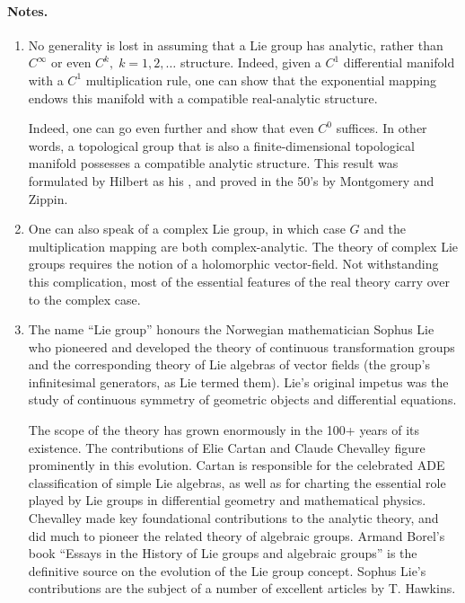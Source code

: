 \documentclass[12pt]{article}
\begin{document}
\paragraph{Notes.}
\begin{enumerate}
\item 
No generality is lost in assuming that a Lie group has analytic,
rather than $C^\infty$ or even $C^k,\; k=1,2,\ldots$ structure.
Indeed, given a $C^1$ differential manifold with a $C^1$
multiplication rule, one can show that the exponential mapping endows
this manifold with a compatible real-analytic structure.  

Indeed, one can go even further and show that even $C^0$ suffices.  In
other words, a topological group that is also a finite-dimensional
topological manifold possesses a compatible analytic structure.  This
result was formulated by Hilbert as his , and
proved in the 50's by Montgomery and Zippin.


\item One can also speak of a complex Lie group, in which case $G$ and the
multiplication mapping are both complex-analytic.  The theory of
complex Lie groups requires the notion of a holomorphic vector-field.
Not withstanding this complication, most of the essential features of
the real theory carry over to the complex case.

\item The name ``Lie group'' honours the Norwegian mathematician
  Sophus Lie who pioneered and developed the theory of continuous
  transformation groups and the corresponding theory of Lie algebras
  of vector fields (the group's infinitesimal generators, as Lie
  termed them).  Lie's original impetus was the study of continuous
  symmetry of geometric objects and differential equations.  
  
  The scope of the theory has grown enormously in the 100+ years of
  its existence.  The contributions of Elie Cartan and Claude
  Chevalley figure prominently in this evolution. Cartan is
  responsible for the celebrated ADE classification of simple Lie
  algebras, as well as for charting the essential role played by Lie
  groups in differential geometry and mathematical physics.  Chevalley
  made key foundational contributions to the analytic theory, and did
  much to pioneer the related theory of algebraic groups.  Armand
  Borel's book ``Essays in the History of Lie groups and algebraic
  groups'' is the definitive source on the evolution of the Lie group
  concept.  Sophus Lie's contributions are the subject of a number of
  excellent articles by T. Hawkins.

\end{enumerate}
\end{document}
